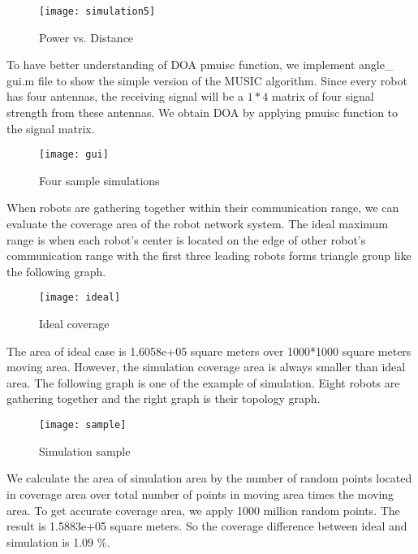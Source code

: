 \begin{figure}[ht]
	\centering
	\texttt{[image: simulation5]}
	\caption{Power vs. Distance}
	\end{figure}
	
\par
	To have better understanding of DOA pmuisc function, we implement angle\_ gui.m file to show the simple version of the MUSIC algorithm. Since every robot has four antennas, the receiving signal will be a $1 * 4$ matrix of four signal strength from these antennas. We obtain DOA by applying pmuisc function to the signal matrix.\\
    \begin{figure}[ht]
	\centering
	\texttt{[image: gui]}
	\caption{Four sample simulations}
	\end{figure}

\par
When robots are gathering together within their communication range, we can evaluate the coverage area of the robot network 
system. The ideal maximum range is when each robot's center is located on the edge of other robot's communication range with the first three leading robots forms triangle group like the following graph.
\begin{figure}[ht]
	\centering
	\texttt{[image: ideal]}
	\caption{Ideal coverage}
	\end{figure}
	
The area of ideal case is 1.6058e+05 square meters over 1000*1000 square meters moving area. However, the simulation coverage area is always smaller than ideal area.
The following graph is one of the example of simulation. Eight robots are gathering together and the right graph is their 
topology graph. 
\begin{figure}[ht]
	\centering
	\texttt{[image: sample]}
	\caption{Simulation sample}
	\end{figure}
We calculate the area of simulation area by the number of random points located in coverage area over total number of points
in moving area times the moving area. To get accurate coverage area, we apply 1000 million random points. The result is 1.5883e+05 square meters. So the coverage difference between ideal and simulation is 1.09 \%.